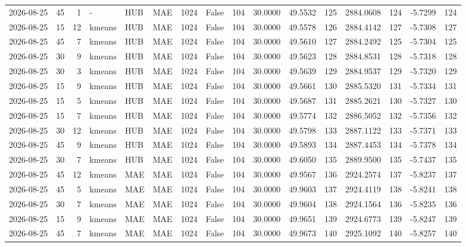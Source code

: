 \documentclass[10pt]{article}
\begin{document}
\begin{landscape}
\begin{longtable}{@{}lrrlllrcrrrrrrrr@{}}
2026-08-25 & 45 & 1 & - & HUB & MAE & 1024 & False & 104 & 30.0000 & 49.5532 & 125 & 2884.0608 & 124 & -5.7299 & 124 \\
2026-08-25 & 15 & 12 & kmeans & HUB & MAE & 1024 & False & 104 & 30.0000 & 49.5578 & 126 & 2884.4142 & 127 & -5.7308 & 127 \\
2026-08-25 & 45 & 7 & kmeans & HUB & MAE & 1024 & False & 104 & 30.0000 & 49.5610 & 127 & 2884.2492 & 125 & -5.7304 & 125 \\
2026-08-25 & 30 & 9 & kmeans & HUB & MAE & 1024 & False & 104 & 30.0000 & 49.5623 & 128 & 2884.8531 & 128 & -5.7318 & 128 \\
2026-08-25 & 30 & 3 & kmeans & HUB & MAE & 1024 & False & 104 & 30.0000 & 49.5639 & 129 & 2884.9537 & 129 & -5.7320 & 129 \\
2026-08-25 & 15 & 9 & kmeans & HUB & MAE & 1024 & False & 104 & 30.0000 & 49.5661 & 130 & 2885.5320 & 131 & -5.7334 & 131 \\
2026-08-25 & 15 & 5 & kmeans & HUB & MAE & 1024 & False & 104 & 30.0000 & 49.5687 & 131 & 2885.2621 & 130 & -5.7327 & 130 \\
2026-08-25 & 15 & 7 & kmeans & HUB & MAE & 1024 & False & 104 & 30.0000 & 49.5774 & 132 & 2886.5052 & 132 & -5.7356 & 132 \\
2026-08-25 & 30 & 12 & kmeans & HUB & MAE & 1024 & False & 104 & 30.0000 & 49.5798 & 133 & 2887.1122 & 133 & -5.7371 & 133 \\
2026-08-25 & 45 & 9 & kmeans & HUB & MAE & 1024 & False & 104 & 30.0000 & 49.5893 & 134 & 2887.4453 & 134 & -5.7378 & 134 \\
2026-08-25 & 30 & 7 & kmeans & HUB & MAE & 1024 & False & 104 & 30.0000 & 49.6050 & 135 & 2889.9500 & 135 & -5.7437 & 135 \\
2026-08-25 & 45 & 12 & kmeans & MAE & MAE & 1024 & False & 104 & 30.0000 & 49.9567 & 136 & 2924.2574 & 137 & -5.8237 & 137 \\
2026-08-25 & 45 & 5 & kmeans & MAE & MAE & 1024 & False & 104 & 30.0000 & 49.9603 & 137 & 2924.4119 & 138 & -5.8241 & 138 \\
2026-08-25 & 30 & 7 & kmeans & MAE & MAE & 1024 & False & 104 & 30.0000 & 49.9604 & 138 & 2924.1564 & 136 & -5.8235 & 136 \\
2026-08-25 & 15 & 9 & kmeans & MAE & MAE & 1024 & False & 104 & 30.0000 & 49.9651 & 139 & 2924.6773 & 139 & -5.8247 & 139 \\
2026-08-25 & 45 & 7 & kmeans & MAE & MAE & 1024 & False & 104 & 30.0000 & 49.9673 & 140 & 2925.1092 & 140 & -5.8257 & 140 \\

\end{longtable}
\end{landscape}
\end{document}
